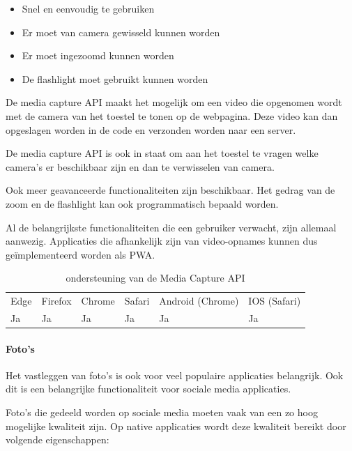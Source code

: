    \begin{itemize}
     \item	Snel en eenvoudig te gebruiken
     \item	Er moet van camera gewisseld kunnen worden
     \item	Er moet ingezoomd kunnen worden
     \item	De flashlight moet gebruikt kunnen worden
   \end{itemize}

De media capture API \autocite{DzungDTran}  maakt het mogelijk om een video die opgenomen wordt met de camera van het toestel te tonen op de webpagina. Deze video kan dan opgeslagen worden in de code en verzonden worden naar een server. 

\autocite{Fransson2017}

De media capture API is ook in staat om aan het toestel te vragen welke camera’s er beschikbaar zijn en dan te verwisselen van camera.

\autocite{Scales2020a}

Ook meer geavanceerde functionaliteiten zijn beschikbaar. Het gedrag van de zoom en de flashlight kan ook programmatisch bepaald worden.

\autocite{Oberhofer2017} \autocite{Ogundipe2018}


Al de belangrijkste functionaliteiten die een gebruiker verwacht, zijn allemaal aanwezig. Applicaties die afhankelijk zijn van video-opnames kunnen dus geïmplementeerd worden als PWA.

\begin{table}[H]
	\centering
	\begin{tabular}{llllll}
		Edge & Firefox & Chrome & Safari & Android (Chrome) & IOS (Safari) \\
		Ja   & Ja      & Ja     & Ja     & Ja               & Ja          
	\end{tabular}	
	\caption{ondersteuning van de Media Capture API}
\end{table}



\paragraph{Foto's }

Het vastleggen van foto’s is ook voor veel populaire applicaties belangrijk. Ook dit is een belangrijke functionaliteit voor sociale media applicaties.

Foto’s die gedeeld worden op sociale media moeten vaak van een zo hoog mogelijke kwaliteit zijn. Op native applicaties wordt deze kwaliteit bereikt door volgende eigenschappen: 

